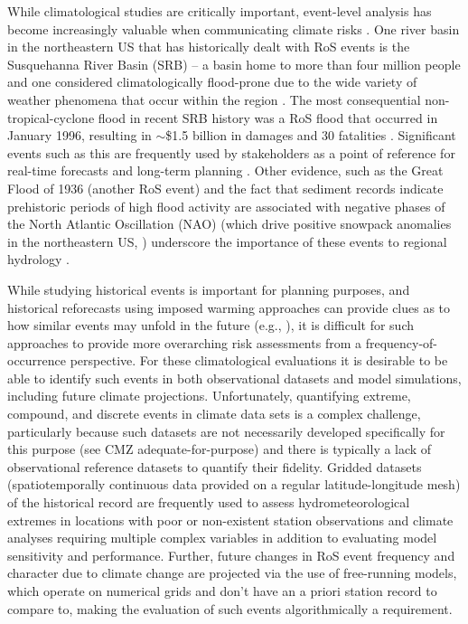 \documentclass[nhess, manuscript]{copernicus}
\begin{document}
While climatological studies are critically important, event-level analysis has become increasingly valuable when communicating climate risks \citep{shepherd2018storylines}.
One river basin in the northeastern US that has historically dealt with RoS events is the Susquehanna River Basin (SRB) -- a basin home to more than four million people \citep{leathers2008hydroclimatic} and one considered climatologically flood-prone due to the wide variety of weather phenomena that occur within the region \citep{perry2000significant}.
The most consequential non-tropical-cyclone flood in recent SRB history was a RoS flood that occurred in January 1996, resulting in $\sim$\$1.5 billion in damages and 30 fatalities \citep{leathers1998severe}. Significant events such as this are frequently used by stakeholders as a point of reference for real-time forecasts and long-term planning \citep{george2019the}.
Other evidence, such as the Great Flood of 1936 (another RoS event) and the fact that sediment records indicate prehistoric periods of high flood activity are associated with negative phases of the North Atlantic Oscillation (NAO) (which drive positive snowpack anomalies in the northeastern US, \citep{hartley1998synoptic}) underscore the importance of these events to regional hydrology \citep{toomey2019the}.

While studying historical events is important for planning purposes, and historical reforecasts using imposed warming approaches can provide clues as to how similar events may unfold in the future (e.g., \citet{pettett2023the}), it is difficult for such approaches to provide more overarching risk assessments from a frequency-of-occurrence perspective. For these climatological evaluations it is desirable to be able to identify such events in both observational datasets and model simulations, including future climate projections. 
Unfortunately, quantifying extreme, compound, and discrete events in climate data sets is a complex challenge, particularly because such datasets are not necessarily developed specifically for this purpose (see CMZ adequate-for-purpose) and there is typically a lack of observational reference datasets to quantify their fidelity.
Gridded datasets (spatiotemporally continuous data provided on a regular latitude-longitude mesh) of the historical record are frequently used to assess hydrometeorological extremes in locations with poor or non-existent station observations and climate analyses requiring multiple complex variables in addition to evaluating model sensitivity and performance.
Further, future changes in RoS event frequency and character due to climate change are projected via the use of free-running models, which operate on numerical grids and don't have an a priori station record to compare to, making the evaluation of such events algorithmically a requirement.
\end{document}
